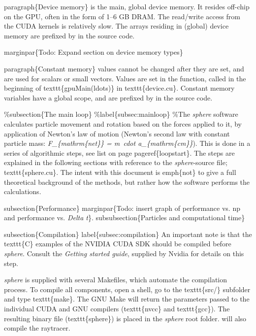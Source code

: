 \documentclass[letterpaper,10pt,english]{sphinxmanual}
\begin{document}
paragraph\{Device memory\} is the main, global device memory. It resides off-chip on the GPU, often in the form of 1--6 GB DRAM. The read/write access from the CUDA kernels is relatively slow. The arrays residing in (global) device memory are prefixed by  in the source code.

marginpar\{Todo: Expand section on device memory types\}

paragraph\{Constant memory\} values cannot be changed after they are set, and are used for scalars or small vectors. Values are set in the  function, called in the beginning of texttt\{gpuMain(ldots)\} in texttt\{device.cu\}. Constant memory variables have a global scope, and are prefixed by  in the source code.

\%subsection\{The main loop\}
\%label\{subsec:mainloop\}
\%The \emph{sphere} software calculates particle movement and rotation based on the forces applied to it, by application of Newton's law of motion (Newton's second law with constant particle mass: \emph{F\_\{mathrm\{net\}\} = m cdot a\_\{mathrm\{cm\}\}}). This is done in a series of algorithmic steps, see list on page pageref\{loopstart\}. The steps are explained in the following sections with reference to the \emph{sphere}-source file; texttt\{sphere.cu\}. The intent with this document is emph\{not\} to give a full theoretical background of the methods, but rather how the software performs the calculations.

subsection\{Performance\}
marginpar\{Todo: insert graph of performance vs. np and performance vs. \emph{Delta t}\}.
subsubsection\{Particles and computational time\}

subsection\{Compilation\}
label\{subsec:compilation\}
An important note is that the texttt\{C\} examples of the NVIDIA CUDA SDK should be compiled before \emph{sphere}. Consult the \emph{Getting started guide}, supplied by Nvidia for details on this step.

\emph{sphere} is supplied with several Makefiles, which automate the compilation process. To compile all components, open a shell, go to the texttt\{src/\} subfolder and type texttt\{make\}. The GNU Make will return the parameters passed to the individual CUDA and GNU compilers (texttt\{nvcc\} and texttt\{gcc\}). The resulting binary file (texttt\{sphere\}) is placed in the \emph{sphere} root folder.  will also compile the raytracer.
\end{document}
